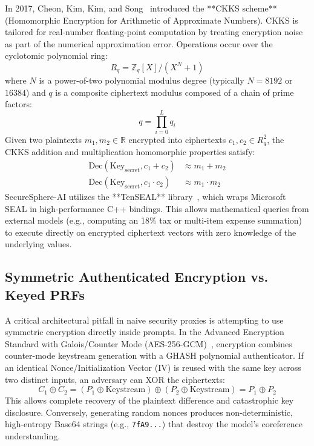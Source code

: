 \documentclass[12pt,a4paper,oneside]{report}
\numberwithin{equation}{chapter}
\begin{document}
In 2017, Cheon, Kim, Kim, and Song~\cite{cheon2017homomorphic} introduced the **CKKS scheme** (Homomorphic Encryption for Arithmetic of Approximate Numbers). CKKS is tailored for real-number floating-point computation by treating encryption noise as part of the numerical approximation error. Operations occur over the cyclotomic polynomial ring:
\begin{equation}
R_q = \mathbb{Z}_q[X] / (X^N + 1)
\end{equation}
where $N$ is a power-of-two polynomial modulus degree (typically $N=8192$ or $16384$) and $q$ is a composite ciphertext modulus composed of a chain of prime factors:
\begin{equation}
q = \prod_{i=0}^L q_i
\end{equation}
Given two plaintexts $m_1, m_2 \in \mathbb{R}$ encrypted into ciphertexts $c_1, c_2 \in R_q^2$, the CKKS addition and multiplication homomorphic properties satisfy:
\begin{align}
\text{Dec}(\text{Key}_{\text{secret}}, c_1 + c_2) &\approx m_1 + m_2 \\
\text{Dec}(\text{Key}_{\text{secret}}, c_1 \cdot c_2) &\approx m_1 \cdot m_2
\end{align}
SecureSphere-AI utilizes the **TenSEAL** library~\cite{tenseal2021}, which wraps Microsoft SEAL in high-performance C++ bindings. This allows mathematical queries from external models (e.g., computing an 18\% tax or multi-item expense summation) to execute directly on encrypted ciphertext vectors with zero knowledge of the underlying values.

\subsection{Symmetric Authenticated Encryption vs. Keyed PRFs}
A critical architectural pitfall in naive security proxies is attempting to use symmetric encryption directly inside prompts. In the Advanced Encryption Standard with Galois/Counter Mode (AES-256-GCM)~\cite{dworkin2007sp800}, encryption combines counter-mode keystream generation with a GHASH polynomial authenticator. If an identical Nonce/Initialization Vector (IV) is reused with the same key across two distinct inputs, an adversary can XOR the ciphertexts:
\begin{equation}
C_1 \oplus C_2 = (P_1 \oplus \text{Keystream}) \oplus (P_2 \oplus \text{Keystream}) = P_1 \oplus P_2
\end{equation}
This allows complete recovery of the plaintext difference and catastrophic key disclosure. Conversely, generating random nonces produces non-deterministic, high-entropy Base64 strings (e.g., \texttt{7fA9...}) that destroy the model's coreference understanding.
\end{document}
